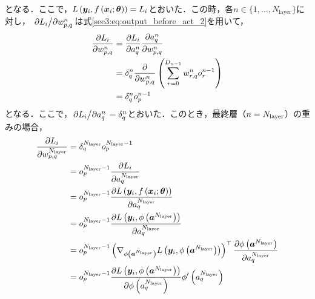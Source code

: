 \documentclass[12pt]{jarticle}
\numberwithin{equation}{section}    %
\numberwithin{figure}{section}      %
\numberwithin{table}{section}      %
\begin{document}
となる．ここで，$L\left(\bm{y}_{i}, f\left(\bm{x}_{i}; \bm{\theta}\right)\right) = L_{i}$とおいた．この時，各$n \in \{1, \ldots, N_{\text{layer}}\}$に対し，
$\pdv*{L_{i}}{w_{p, q}^{n}}$は式\eqref{sec3:eq:output_before_act_2}を用いて，
\begin{align}
    \pdv{L_{i}}{w_{p, q}^{n}} & = \pdv{L_{i}}{a_{q}^{n}} \pdv{a_{q}^{n}}{w_{p, q}^{n}}                \\
                                                     & = \delta_{q}^{n} \pdv{w_{p, q}^{n}} \left(\sum_{r = 0}^{D_{n - 1}} w_{r, q}^{n} o_{r}^{n - 1}\right) \\
                                                     & = \delta_{q}^{n} o_{p}^{n - 1}
\end{align}
となる．ここで，$\pdv*{L_{i}}{a_{q}^{n}} = \delta_{q}^{n}$とおいた．このとき，最終層（$n = N_{\text{layer}}$）の重みの場合，
\begin{align}
    \pdv{L_{i}}{w_{p, q}^{N_{\text{layer}}}} & = \delta_{q}^{N_{\text{layer}}} o_{p}^{N_{\text{layer}} - 1}                                                                                                                                                                                                           \\
                                                               & = o_{p}^{N_{\text{layer}} - 1} \pdv{L_{i}}{a_{q}^{N_{\text{layer}}}}                                                                                                                                                                                                   \\
                                                               & = o_{p}^{N_{\text{layer}} - 1} \pdv{L\left(\bm{y}_{i}, f\left(\bm{x}_{i}; \bm{\theta}\right)\right)}{a_{q}^{N_{\text{layer}}}}                                                                                           \\
                                                               & = o_{p}^{N_{\text{layer}} - 1} \pdv{L\left(\bm{y}_{i}, \phi\left(\bm{a}^{N_{\text{layer}}}\right)\right)}{a_{q}^{N_{\text{layer}}}}                                                                                                          \\
                                                               & = o_{p}^{N_{\text{layer}} - 1} \left(\nabla_{\phi\left(\bm{a}^{N_{\text{layer}}}\right)} L\left(\bm{y}_{i}, \phi\left(\bm{a}^{N_{\text{layer}}}\right)\right)\right)^\top \pdv{\phi\left(\bm{a}^{N_{\text{layer}}}\right)}{a_{q}^{N_{\text{layer}}}} \\
                                                               & = o_{p}^{N_{\text{layer}} - 1} \pdv{L\left(\bm{y}_{i}, \phi\left(\bm{a}^{N_{\text{layer}}}\right)\right)}{\phi\left(a_{q}^{N_{\text{layer}}}\right)} \phi'\left(a_{q}^{N_{\text{layer}}}\right)
\end{align}
\end{document}
